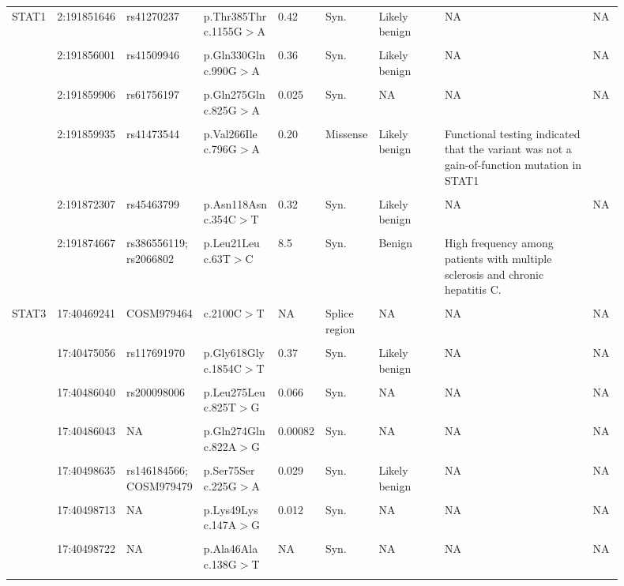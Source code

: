 \begin{landscape}
\begin{longtable}{p{0.07\linewidth}|p{0.09\linewidth}p{0.11\linewidth}p{0.1\linewidth}p{0.05\linewidth}p{0.065\linewidth}p{0.11\linewidth}p{0.25\linewidth}p{0.05\linewidth}}
		\\
		\\
		\hline
		STAT1 & 2:191851646 & rs41270237 & p.Thr385Thr c.1155G$>$A & 0.42 & Syn. & Likely benign & NA & NA
		\\
		\\
		& 2:191856001 & rs41509946 & p.Gln330Gln c.990G$>$A & 0.36 & Syn. & Likely benign & NA & NA
		\\
		\\
		& 2:191859906 & rs61756197 & p.Gln275Gln c.825G$>$A & 0.025 & Syn. & NA & NA & NA
		\\
		\\
		& 2:191859935 & rs41473544 & p.Val266Ile c.796G$>$A & 0.20 & Missense & Likely benign & Functional testing indicated that the variant was not a gain-of-function mutation in STAT1 & \cite{Depner2016}
		\\
		\\
		& 2:191872307 & rs45463799 & p.Asn118Asn c.354C$>$T & 0.32 & Syn. & Likely benign & NA & NA
		\\
		\\
		& 2:191874667 & rs386556119; rs2066802 & p.Leu21Leu c.63T$>$C & 8.5 & Syn. & Benign & High frequency among patients with multiple sclerosis and chronic hepatitis C. & \cite{Fortunato2008}
		\\
		\\
		\hline
		STAT3 & 17:40469241 & COSM979464 & c.2100C$>$T & NA & Splice region & NA & NA & NA
		\\
		\\
		& 17:40475056 & rs117691970 & p.Gly618Gly c.1854C$>$T & 0.37 & Syn. & Likely benign & NA & NA
		\\
		\\
		& 17:40486040 & rs200098006 & p.Leu275Leu c.825T$>$G & 0.066 & Syn. & NA & NA & NA
		\\
		\\
		& 17:40486043 & NA & p.Gln274Gln c.822A$>$G & 0.00082 & Syn. & NA & NA & NA
		\\
		\\
		& 17:40498635 & rs146184566; COSM979479 & p.Ser75Ser c.225G$>$A & 0.029 & Syn. & Likely benign & NA & NA
		\\
		\\
		& 17:40498713 & NA & p.Lys49Lys c.147A$>$G & 0.012 & Syn. & NA & NA & NA
		\\
		\\
		& 17:40498722 & NA & p.Ala46Ala c.138G$>$T & NA & Syn. & NA & NA & NA
		\\
		\\

\end{longtable}
\end{landscape}
